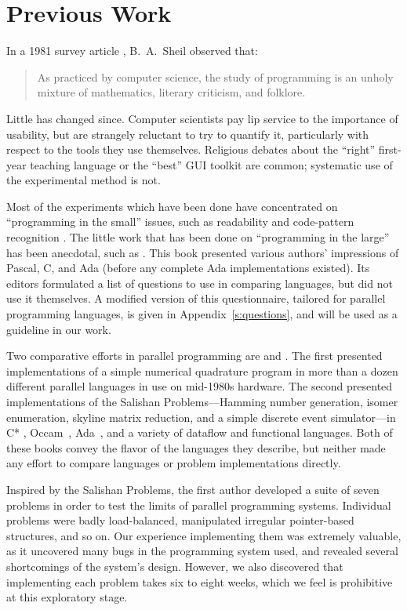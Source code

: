 \section{Previous Work\label{s:previous}}

In a 1981 survey article \cite{b:psych-prog-survey}, B.~A.\ Sheil observed that:
\begin{quote}
As practiced by computer science,
the study of programming is an unholy mixture of mathematics,
literary criticism,
and folklore.
\end{quote}
Little has changed since.
Computer scientists pay lip service to the importance of usability,
but are strangely reluctant to try to quantify it,
particularly with respect to the tools they use themselves.
Religious debates about the ``right'' first-year teaching language
or the ``best'' GUI toolkit are common;
systematic use of the experimental method is not.

Most of the experiments which have been done have concentrated on ``programming in the small'' issues,
such as readability and code-pattern recognition
\cite{b:reverse-parsing-2,b:cloze-program-1,b:prog-comprehension-1}.
The little work that has been done on ``programming in the large'' has been anecdotal,
such as \cite{b:compare-ada-c-pascal}.
This book presented various authors' impressions of Pascal, C, and Ada
(before any complete Ada implementations existed).
Its editors formulated a list of questions to use in comparing languages,
but did not use it themselves.
A modified version of this questionnaire,
tailored for parallel programming languages,
is given in Appendix~\ref{s:questions},
and will be used as a guideline in our work.

Two comparative efforts in parallel programming are \cite{b:babb-cases} and \cite{b:salishan}.
The first presented implementations of a simple numerical quadrature program
in more than a dozen different parallel languages
in use on mid-1980s hardware.
The second presented implementations of
the Salishan Problems---Hamming number generation,
isomer enumeration,
skyline matrix reduction,
and a simple discrete event simulator---in
C* \cite{b:dataparallel-c}, Occam~\cite{b:occam}, Ada~\cite{b:ada},
and a variety of dataflow and functional languages.
Both of these books convey the flavor of the languages they describe,
but neither made any effort to compare languages or problem implementations directly.

Inspired by the Salishan Problems,
the first author developed a suite of seven problems \cite{b:cowichan-1}
in order to test the limits of parallel programming systems.
Individual problems were badly load-balanced,
manipulated irregular pointer-based structures,
and so on.
Our experience implementing them was extremely valuable,
as it uncovered many bugs in the programming system used,
and revealed several shortcomings of the system's design.
However,
we also discovered that implementing each problem takes six to eight weeks,
which we feel is prohibitive at this exploratory stage.

